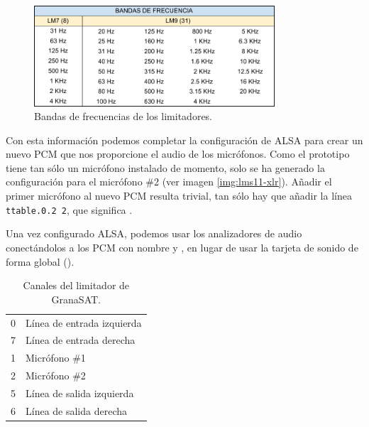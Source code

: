 \begin{figure}[ht]
    \centering
    \includegraphics[width=0.8\textwidth]{figuras/lms-frecuencias.pdf}
    \caption{Bandas de frecuencias de los limitadores.}
    \label{fig:lms-freq}
\end{figure}

Con esta información podemos completar la configuración de \acrshort{ALSA} para crear un nuevo \acrshort{PCM} que nos proporcione el audio de los micrófonos. Como el prototipo tiene tan sólo un micrófono instalado de momento, solo se ha generado la configuración para el micrófono \#2 (ver imagen \ref{img:lms11-xlr}). Añadir el primer micrófono al nuevo \acrshort{PCM} resulta trivial, tan sólo hay que añadir la línea \texttt{ttable.0.2 2}, que significa .

Una vez configurado \acrshort{ALSA}, podemos usar los analizadores de audio conectándolos a los \acrshort{PCM} con nombre  y , en lugar de usar la tarjeta de sonido de forma global ().

\begin{table}[hb]
\centering
\begin{tabular}{l|l}
0 & Línea de entrada izquierda \\
7 & Línea de entrada derecha   \\
1 & Micrófono \#1              \\
2 & Micrófono \#2              \\
5 & Línea de salida izquierda  \\
6 & Línea de salida derecha
\end{tabular}
\caption{Canales del limitador de GranaSAT.}
\label{tab:lms11-canales}
\end{table}

\newpage

